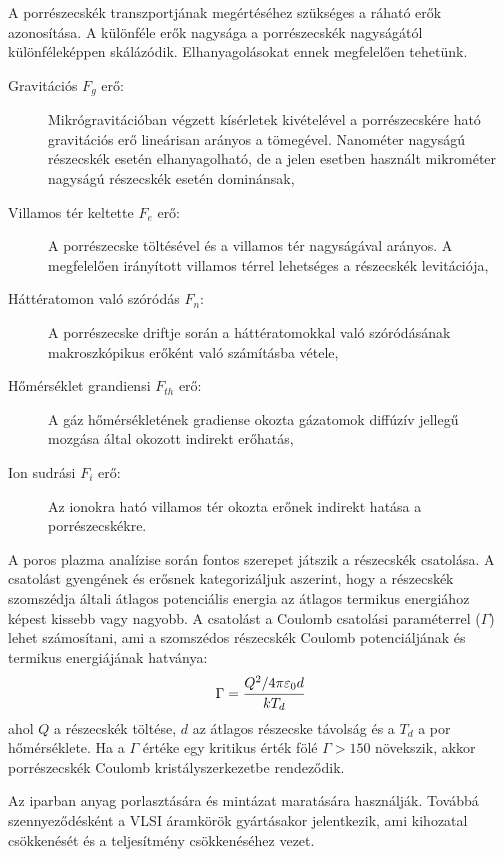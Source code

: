 	A porrészecskék transzportjának megértéséhez szükséges a ráható erők azonosítása.
	A különféle erők nagysága a porrészecskék nagyságától különféleképpen skálázódik. Elhanyagolásokat
	ennek megfelelően tehetünk.
	\begin{description}
		\item[Gravitációs $F_g$ erő:] Mikrógravitációban végzett kísérletek kivételével a porrészecskére
			ható gravitációs erő lineárisan arányos a tömegével. Nanométer nagyságú részecskék esetén
			elhanyagolható, de a jelen esetben használt mikrométer nagyságú részecskék esetén dominánsak,
		\item[Villamos tér keltette $F_e$ erő:] A porrészecske töltésével és a villamos tér nagyságával
			arányos. A megfelelően irányított villamos térrel lehetséges a részecskék levitációja,  
		\item[Háttératomon való szóródás $F_n$:] A porrészecske driftje során a háttératomokkal való
			szóródásának makroszkópikus erőként való számításba vétele,
		\item[Hőmérséklet grandiensi $F_{th}$ erő:] A gáz hőmérsékletének gradiense okozta
			gázatomok diffúzív jellegű mozgása által okozott indirekt erőhatás,
		\item[Ion sudrási $F_i$ erő:] Az ionokra ható villamos tér okozta erőnek indirekt hatása a
			porrészecskékre.
	\end{description}
	A poros plazma analízise során fontos szerepet játszik a részecskék csatolása.
	A csatolást gyengének és erősnek kategorizáljuk aszerint, hogy a részecskék szomszédja általi
	átlagos potenciális energia az átlagos termikus energiához képest kissebb vagy nagyobb.
	A csatolást a Coulomb csatolási paraméterrel ($\Gamma$) lehet számosítani, ami a szomszédos
	részecskék Coulomb potenciáljának és termikus energiájának hatványa:
	\begin{equation}
		\Gamma = \cfrac{Q^2 / 4\pi\varepsilon_0 d}{kT_d} 
	\end{equation}
	ahol $Q$ a részecskék töltése, $d$ az átlagos részecske távolság és a $T_d$ a por hőmérséklete.
	Ha a $\Gamma$ értéke egy kritikus érték fölé $\Gamma > 150$ növekszik, akkor
	porrészecskék Coulomb kristályszerkezetbe rendeződik.
	
	Az iparban anyag porlasztására és mintázat maratására használják. Továbbá szennyeződésként a VLSI
	áramkörök gyártásakor jelentkezik, ami kihozatal csökkenését és a teljesítmény csökkenéséhez vezet.

